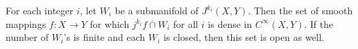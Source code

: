 For each integer $i$, let $W_{i}$ be a submanifold of $J^{k_{i}}(X, Y)$. Then the set of smooth mappings $f: X \to Y$ for which $j^{k_{i}} f \mathrel{\overline{\cap}} W_{i}$ for all $i$ is dense in $C^{\infty}(X, Y)$. If the number of $W_{i}$'s is finite and each $W_{i}$ is closed, then this set is open as well.
